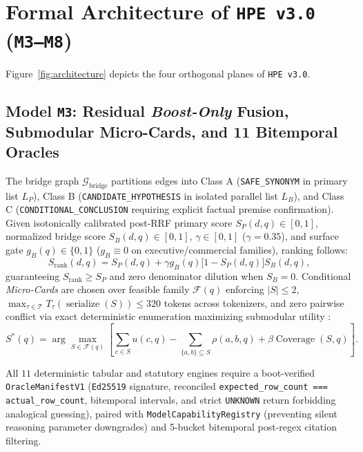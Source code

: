 \documentclass[10pt,twocolumn]{article}
\begin{document}
\section{Formal Architecture of \texttt{HPE v3.0} (\texttt{M3--M8})}

Figure~\ref{fig:architecture} depicts the four orthogonal planes of \texttt{HPE v3.0}.

\subsection{Model \texttt{M3}: Residual \emph{Boost-Only} Fusion, Submodular Micro-Cards, and 11 Bitemporal Oracles}

The bridge graph $\mathcal{G}_{\mathrm{bridge}}$ partitions edges into Class A (\texttt{SAFE\_SYNONYM} in primary list $L_P$), Class B (\texttt{CANDIDATE\_HYPOTHESIS} in isolated parallel list $L_B$), and Class C (\texttt{CONDITIONAL\_CONCLUSION} requiring explicit factual premise confirmation). Given isotonically calibrated post-RRF \cite{cormack2009reciprocal} primary score $S_P(d,q) \in [0,1]$, normalized bridge score $S_B(d,q) \in [0,1]$, $\gamma \in [0,1]$ ($\gamma=0.35$), and surface gate $g_B(q) \in \{0,1\}$ ($g_B \equiv 0$ on executive/commercial families), ranking follows:
\begin{equation}
S_{\mathrm{rank}}(d,q) = S_P(d,q) + \gamma g_B(q)\bigl[1 - S_P(d,q)\bigr]S_B(d,q),
\end{equation}
guaranteeing $S_{\mathrm{rank}} \ge S_P$ and zero denominator dilution when $S_B=0$. Conditional \emph{Micro-Cards} are chosen over feasible family $\mathcal{F}(q)$ enforcing $|S|\le 2$, $\max_{\tau \in \mathcal{T}} T_\tau(\operatorname{serialize}(S)) \le 320$ tokens across tokenizers, and zero pairwise conflict via exact deterministic enumeration maximizing submodular utility \cite{nemhauser1978analysis}:
\begin{equation}
S^*(q) = \arg\max_{S \in \mathcal{F}(q)} \left[\sum_{c \in S} u(c,q) - \!\!\sum_{\{a,b\}\subseteq S}\!\! \rho(a,b,q) + \beta \operatorname{Coverage}(S,q)\right].
\end{equation}

All $11$ deterministic tabular and statutory engines require a boot-verified \texttt{OracleManifestV1} (\texttt{Ed25519} signature, reconciled \texttt{expected\_row\_count === actual\_row\_count}, bitemporal intervals, and strict \texttt{UNKNOWN} return forbidding analogical guessing), paired with \texttt{ModelCapabilityRegistry} (preventing silent reasoning parameter downgrades) and 5-bucket bitemporal post-regex citation filtering.
\end{document}
